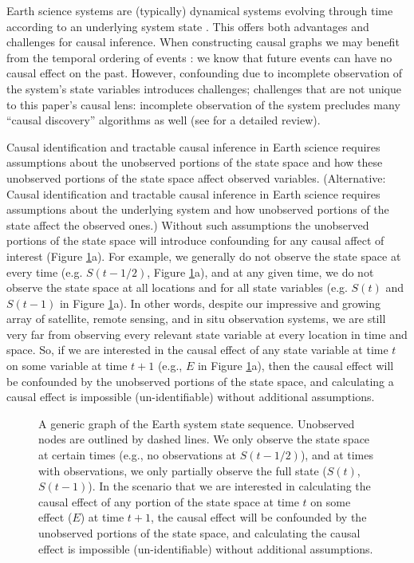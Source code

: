 \documentclass[12pt]{article}
\begin{document}
Earth science systems are (typically) dynamical systems evolving
through time according to an underlying system state
\citep{lorenz-1963,lorenz1996predictability,majda-state}. This offers
both advantages and challenges for causal inference. When constructing
causal graphs we may benefit from the temporal ordering of events
\citep{runge2019inferring}: we know that future events can have no
causal effect on the past. However, confounding due to incomplete
observation of the system's state variables introduces challenges;
challenges that are not unique to this paper's causal lens: incomplete
observation of the system precludes many ``causal discovery''
algorithms as well (see \citet{runge2019inferring} for a detailed
review).

Causal identification and tractable causal inference in Earth science
requires assumptions about the unobserved portions of the state space
and how these unobserved portions of the state space affect observed
variables. (Alternative: Causal identification and tractable causal
inference in Earth science requires assumptions about the underlying
system and how unobserved portions of the state affect the observed
ones.) Without such assumptions the unobserved portions of the state
space will introduce confounding for any causal affect of interest
(Figure \ref{fig:generic}a). For example, we generally do not observe
the state space at every time (e.g. $S(t-1/2)$, Figure
\ref{fig:generic}a), and at any given time, we do not observe the
state space at all locations and for all state variables (e.g. $S(t)$
and $S(t-1)$ in Figure \ref{fig:generic}a). In other words, despite
our impressive and growing array of satellite, remote sensing, and in
situ observation systems, we are still very far from observing every
relevant state variable at every location in time and space.  So, if
we are interested in the causal effect of any state variable at time
$t$ on some variable at time $t+1$ (e.g., $E$ in Figure
\ref{fig:generic}a), then the causal effect will be confounded by the
unobserved portions of the state space, and calculating a causal
effect is impossible (un-identifiable) without additional
assumptions.

\begin{figure} 
  \caption{A generic graph of the Earth system state
    sequence. Unobserved nodes are outlined by dashed lines. We only
    observe the state space at certain times (e.g., no observations at
    $S(t-1/2)$), and at times with observations, we only partially
    observe the full state ($S(t)$, $S(t-1)$). In the scenario that we
    are interested in calculating the causal effect of any portion of
    the state space at time $t$ on some effect ($E$) at time $t+1$,
    the causal effect will be confounded by the unobserved portions of
    the state space, and calculating the causal effect is impossible
    (un-identifiable) without additional assumptions.}
  \label{fig:generic}
\end{figure}
\end{document}
